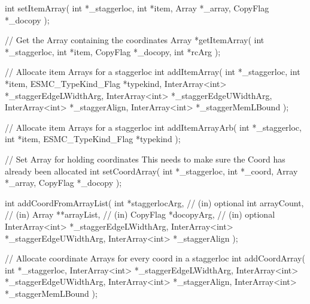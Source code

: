 {{  int setItemArray(
                    int *_staggerloc,
            int *item,    
                    Array *_array,
                    CopyFlag *_docopy
                    );
 
 
  // Get the Array containing the coordinates
  Array *getItemArray(
                       int *_staggerloc,
                       int *item, 
                       CopyFlag *_docopy,
                       int *rcArg
                       );
 
  // Allocate item Arrays for a staggerloc
  int addItemArray(
                      int *_staggerloc,
              int *item,
              ESMC_TypeKind_Flag *typekind,          
                      InterArray<int> *_staggerEdgeLWidthArg,
                      InterArray<int> *_staggerEdgeUWidthArg,
                      InterArray<int> *_staggerAlign,
                      InterArray<int> *_staggerMemLBound
                      );
 
  // Allocate item Arrays for a staggerloc
  int addItemArrayArb(
                      int *_staggerloc,
              int *item,
              ESMC_TypeKind_Flag *typekind          
                      );
 
 
 
  // Set Array for holding coordinates
   This needs to make sure the Coord has already been allocated
  int setCoordArray(
                    int *_staggerloc,
                    int *_coord,
                    Array *_array,
                    CopyFlag *_docopy
                    );
 
 
 
  int addCoordFromArrayList(
                        int *staggerlocArg,        // (in) optional
                        int arrayCount,             // (in) 
                        Array **arrayList,           // (in)
                        CopyFlag *docopyArg,   // (in) optional
                        InterArray<int> *_staggerEdgeLWidthArg,
                        InterArray<int> *_staggerEdgeUWidthArg,
                        InterArray<int> *_staggerAlign
                        );
 
 
  // Allocate coordinate Arrays for every coord in a staggerloc
  int addCoordArray(
                      int *_staggerloc,
                      InterArray<int> *_staggerEdgeLWidthArg,
                      InterArray<int> *_staggerEdgeUWidthArg,
                      InterArray<int> *_staggerAlign,
                      InterArray<int> *_staggerMemLBound
                      );
 
}}
